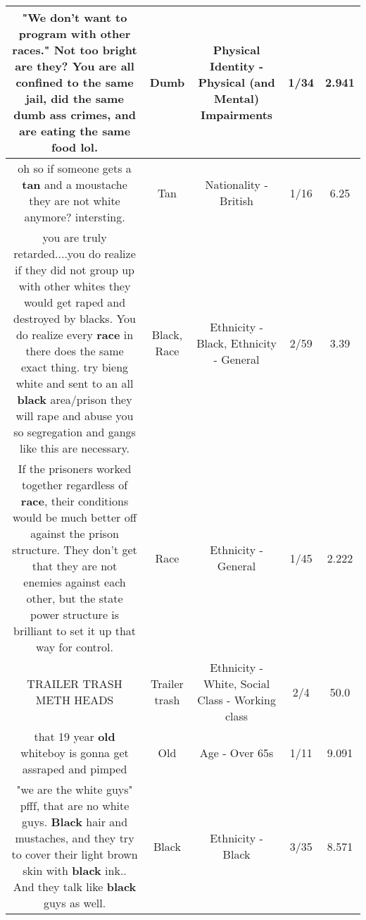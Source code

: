 \documentclass[11pt]{article}
\newlength\mylength
\begin{document}
\begin{center}
\begin{longtable}{|C{.65\mylength}|C{.30\mylength}|C{.12\mylength}|C{.12\mylength}|C{.12\mylength}|}
  \small "We don't want to program with other races." Not too bright are they?  You are all confined to the same jail, did the same \textbf{dumb} ass crimes, and are eating the same food lol.\normalsize   & Dumb & Physical Identity - Physical (and Mental) Impairments & 1/34 & 2.941 \\  \hline
  \small oh so if someone gets a \textbf{tan} and a moustache they are not white anymore?  intersting.\normalsize   & Tan & Nationality - British & 1/16 & 6.25 \\  \hline
  \small you are truly retarded....you do realize if they did not group up with other whites they would get raped and destroyed by blacks.  You do realize every \textbf{race} in there does the same exact thing.  try bieng white and sent to an all \textbf{black} area/prison they will rape and abuse you so segregation and gangs like this are necessary.\normalsize   & Black, Race & Ethnicity - Black, Ethnicity - General & 2/59 & 3.39 \\  \hline
  \small If the prisoners worked together regardless of \textbf{race}, their conditions would be much better off against the prison structure. They don't get that they are not enemies against each other, but the state power structure is brilliant to set it up that way for control.\normalsize   & Race & Ethnicity - General & 1/45 & 2.222 \\  \hline
  \small TRAILER TRASH METH HEADS\normalsize   & Trailer trash & Ethnicity - White, Social Class - Working class & 2/4 & 50.0 \\  \hline
  \small that 19 year \textbf{old} whiteboy is gonna get assraped and pimped\normalsize   & Old & Age - Over 65s & 1/11 & 9.091 \\  \hline
  \small "we are the white guys" pfff, that are no white guys. \textbf{Black} hair and mustaches, and they try to cover their light brown skin with \textbf{black} ink.. And they talk like \textbf{black} guys as well.\normalsize   & Black & Ethnicity - Black & 3/35 & 8.571 \\  \hline

\end{longtable}
\end{center}
\end{document}
